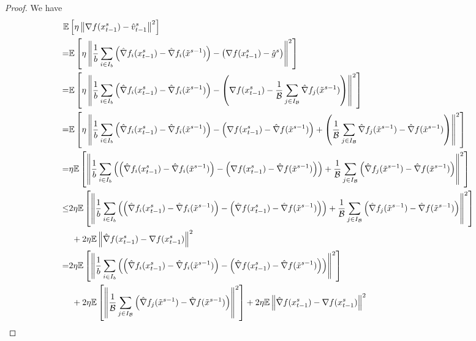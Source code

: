 \documentclass[iicol,sn-basic]{sn-jnl}
\theoremstyle{thmstyleone}%
\theoremstyle{thmstyletwo}%
\theoremstyle{thmstylethree}%
\newcommand*{\E}{\mathbb{E}}
\newcommand{\norm}[1]{\left\lVert#1\right\rVert}
\begin{document}
\begin{proof}
We have
\begin{align}
  \E&\left[\eta\norm{\nabla f(x_{t-1}^s)-{\hat{v}_{t-1}^s}}^2\right]\notag\\
   =&\E\left[\eta\norm{\frac{1}{b}\sum_{i\in I_b}\left(\hat{\nabla} f_i(x_{t-1}^s)-\hat{\nabla} f_i(\tilde{x}^{s-1})\right) - \left(\nabla f(x_{t-1}^s)-\hat{g}^s\right)}^2\right]\notag\\
   =&\E\left[\eta\norm{\frac{1}{b}\sum_{i\in I_b}\left(\hat{\nabla} f_i(x_{t-1}^s)-\hat{\nabla} f_i(\tilde{x}^{s-1})\right) - \left(\nabla f(x_{t-1}^s)-\frac{1}{\mathcal{B}}\sum_{j\in I_{\mathcal{B}}}\hat{\nabla} f_j(\tilde{x}^{s-1})\right)}^2\right]\notag\\
   =&\notag\E\left[\eta\norm{\frac{1}{b}\sum_{i\in I_b}\left(\hat{\nabla} f_i(x_{t-1}^s)-\hat{\nabla} f_i(\tilde{x}^{s-1})\right) - \left(\nabla f(x_{t-1}^s) - \hat{\nabla} f(\tilde{x}^{s-1}) \right)+ \left(\frac{1}{\mathcal{B}}\sum_{j\in I_{\mathcal{B}}}\hat{\nabla} f_j(\tilde{x}^{s-1}) - \hat{\nabla} f(\tilde{x}^{s-1})\right)}^2\right]\\
   =&\notag\eta\E\left[\norm{\frac{1}{b}\sum_{i\in I_b}\left(\left(\hat{\nabla} f_i(x_{t-1}^s)-\hat{\nabla} f_i(\tilde{x}^{s-1})\right) - \left(\nabla f(x_{t-1}^s) - \hat{\nabla} f(\tilde{x}^{s-1}) \right)\right)+ \frac{1}{\mathcal{B}}\sum_{j\in I_{\mathcal{B}}}\left(\hat{\nabla} f_j(\tilde{x}^{s-1}) - \hat{\nabla} f(\tilde{x}^{s-1})\right)}^2\right]\\
   \leq &\notag2\eta\E\left[\norm{\frac{1}{b}\sum_{i\in I_b}\left(\left(\hat{\nabla} f_i(x_{t-1}^s)-\hat{\nabla} f_i(\tilde{x}^{s-1})\right) - \left(\hat{\nabla} f(x_{t-1}^s) - \hat{\nabla} f(\tilde{x}^{s-1}) \right)\right)+ \frac{1}{\mathcal{B}}\sum_{j\in I_{\mathcal{B}}}\left(\hat{\nabla} f_j(\tilde{x}^{s-1}) - \hat{\nabla} f(\tilde{x}^{s-1})\right)}^2\right]\\
   &\,\, + 2\eta \E \norm{\hat{\nabla} f(x_{t-1}^s)-\nabla f(x_{t-1}^s)}^2\label{var-estimate-lem-1}\\
    = &\notag 2 \eta\E\left[\norm{\frac{1}{b}\sum_{i\in I_b}\left(\left(\hat{\nabla} f_i(x_{t-1}^s)-\hat{\nabla} f_i(\tilde{x}^{s-1})\right) - \left(\hat{\nabla} f(x_{t-1}^s) - \hat{\nabla} f(\tilde{x}^{s-1}) \right)\right)}^2\right]\\
   &\,\, +2 \eta \E \left[ \norm{\frac{1}{\mathcal{B}}\sum_{j\in I_{\mathcal{B}}}\left(\hat{\nabla} f_j(\tilde{x}^{s-1}) - \hat{\nabla} f(\tilde{x}^{s-1})\right)}^2\right]+ 2\eta \E \norm{\hat{\nabla} f(x_{t-1}^s)-\nabla f(x_{t-1}^s)}^2\label{var-estimate-lem-2}\\

\end{align}
\end{proof}
\end{document}
